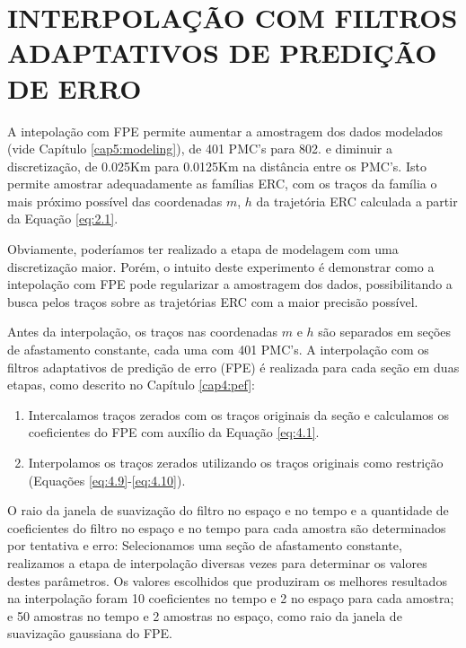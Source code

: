 %
% 
% 
% 
% 
% 
% 

\chapter{INTERPOLAÇÃO COM FILTROS ADAPTATIVOS DE PREDIÇÃO DE ERRO}
\label{cap6:interpolacao}

A intepolação com FPE permite aumentar a amostragem dos dados modelados (vide Capítulo \ref{cap5:modeling}),
de 401 PMC's para 802.
e diminuir a discretização, de 0.025Km para 0.0125Km na distância entre os PMC's.
Isto permite amostrar adequadamente as famílias ERC, com os traços da família o mais próximo possível
das coordenadas $m$, $h$ da trajetória ERC calculada a partir da Equação \ref{eq:2.1}.

Obviamente, poderíamos ter realizado a etapa de modelagem com uma discretização maior. 
Porém, o intuito deste experimento é demonstrar como
a intepolação com FPE pode regularizar a amostragem dos dados, possibilitando a busca pelos
traços sobre as trajetórias ERC com a maior precisão possível.

Antes da interpolação, os traços nas coordenadas $m$ e $h$ são separados em seções de afastamento constante, 
cada uma com 401 PMC's.
A interpolação com os filtros adaptativos de predição de erro (FPE) é realizada para cada seção em duas etapas,
como descrito no Capítulo \ref{cap4:pef}:

\begin{enumerate}
 \item Intercalamos traços zerados com os traços originais da seção e calculamos os coeficientes do FPE
 com auxílio da Equação \ref{eq:4.1}.
 
 \item Interpolamos os traços zerados utilizando os traços originais como restrição (Equações \ref{eq:4.9}-\ref{eq:4.10}).
\end{enumerate}

O raio da janela de suavização do filtro no espaço e no tempo e a quantidade de coeficientes do filtro no espaço e no
tempo para cada amostra são determinados por tentativa e erro: Selecionamos uma seção de afastamento constante, realizamos a
etapa de interpolação diversas vezes para determinar os valores destes parâmetros. 
Os valores escolhidos que produziram os melhores resultados na interpolação
foram 10 coeficientes no tempo e 2 no
espaço para cada amostra; e 50 amostras no tempo e 2 amostras no espaço,
como raio da janela de suavização gaussiana do FPE.

